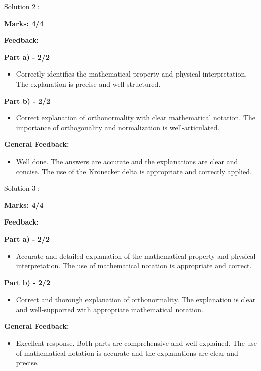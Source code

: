 \documentclass[a4paper,11pt]{article}
\begin{document}
Solution 2 :

\textbf{Marks: 4/4}

\textbf{Feedback:}

\textbf{Part a) - 2/2}

\begin{itemize}
    \item Correctly identifies the mathematical property and physical interpretation. The explanation is precise and well-structured.
\end{itemize}

\textbf{Part b) - 2/2}

\begin{itemize}
    \item Correct explanation of orthonormality with clear mathematical notation. The importance of orthogonality and normalization is well-articulated.
\end{itemize}

\textbf{General Feedback:}

\begin{itemize}
    \item Well done. The answers are accurate and the explanations are clear and concise. The use of the Kronecker delta is appropriate and correctly applied.
\end{itemize}


Solution 3 :

\textbf{Marks: 4/4}

\textbf{Feedback:}

\textbf{Part a) - 2/2}

\begin{itemize}
    \item Accurate and detailed explanation of the mathematical property and physical interpretation. The use of mathematical notation is appropriate and correct.
\end{itemize}

\textbf{Part b) - 2/2}

\begin{itemize}
    \item Correct and thorough explanation of orthonormality. The explanation is clear and well-supported with appropriate mathematical notation.
\end{itemize}

\textbf{General Feedback:}

\begin{itemize}
    \item Excellent response. Both parts are comprehensive and well-explained. The use of mathematical notation is accurate and the explanations are clear and precise.
\end{itemize}
\end{document}
